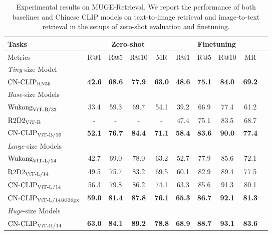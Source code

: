 \documentclass[11pt]{article}
\begin{document}
 
\begin{table*}[t]
\center
\small
\vskip 0.15in
\begin{adjustbox}{max width=1.\textwidth}
\begin{tabular}{@{\extracolsep{\fill}}lccccccccc}
\toprule
  Tasks
  &\multicolumn{4}{c}{Zero-shot}
&\multicolumn{4}{c}{Finetuning}
  \\
\midrule
  Metrics & R@1 & R@5 & R@10 & MR & R@1 & R@5 & R@10 & MR
  \\
\midrule
    \multicolumn{9}{l}{\textit{Tiny}-size Model} \\
    $\text{CN-CLIP}\rm_{RN50}$
    & \textbf{42.6}	& \textbf{68.6}	& \textbf{77.9}	& \textbf{63.0}	& \textbf{48.6}	& \textbf{75.1}	& \textbf{84.0}	& \textbf{69.2}
    \\
\midrule
    \multicolumn{9}{l}{\textit{Base}-size Models} \\
    $\text{Wukong}\rm_{ViT\text{-}B/32}$
    & 33.4	& 59.3	& 69.7	& 54.1	& 39.2	& 66.9	& 77.4	& 61.2
    \\
    $\text{R2D2}\rm_{ViT\text{-}B}$
    & -	& -	& -	& -	& 47.4	& 75.1	& 83.5	& 68.7
    \\
    $\text{CN-CLIP}\rm_{ViT\text{-}B/16}$
    & \textbf{52.1}	& \textbf{76.7}	& \textbf{84.4}	& \textbf{71.1}	& \textbf{58.4}	& \textbf{83.6}	& \textbf{90.0}	& \textbf{77.4}
    \\
\midrule
    \multicolumn{9}{l}{\textit{Large}-size Models} \\
    $\text{Wukong}\rm_{ViT\text{-}L/14}$
    & 42.7	& 69.0	& 78.0	& 63.2	& 52.7	& 77.9	& 85.6	& 72.1
    \\
    $\text{R2D2}\rm_{ViT\text{-}L/14}$
    & 49.5 	& 75.7 	& 83.2	& 69.5	& 60.1 	& 82.9 	& 89.4 	& 77.5
    \\
    $\text{CN-CLIP}\rm_{ViT\text{-}L/14}$
    & 56.3	& 79.8	& 86.2	& 74.1	& 63.3	& 85.6	& 91.3	& 80.1
    \\
    $\text{CN-CLIP}\rm_{ViT\text{-}L/14@336px}$
    & \textbf{59.0}	& \textbf{81.4}	& \textbf{87.8}	& \textbf{76.1}	& \textbf{65.3}	& \textbf{86.7}	& \textbf{92.1}	& \textbf{81.3}
    \\
\midrule
    \multicolumn{9}{l}{\textit{Huge}-size Models} \\
    $\text{CN-CLIP}\rm_{ViT\text{-}H/14}$
    & \textbf{63.0}	& \textbf{84.1}	& \textbf{89.2}	& \textbf{78.8}	& \textbf{68.9}	& \textbf{88.7}	& \textbf{93.1}	& \textbf{83.6}
    \\
\bottomrule
\end{tabular}
\end{adjustbox}
\caption{Experimental results on MUGE-Retrieval. We report the performance of both baselines and Chinese CLIP models on text-to-image retrieval and image-to-text retrieval in the setups of zero-shot evaluation and finetuning. }
\label{tb:muge}
\end{table*}
\end{document}
